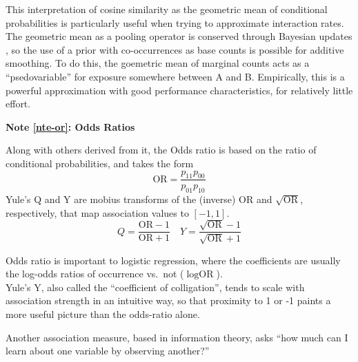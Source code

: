 \documentclass[%
	12pt,
		oneside,
		letterpaper
]{book}
\newcounter{quartocalloutnteno}
\newcommand{\quartocalloutnte}[1]{\refstepcounter{quartocalloutnteno}\label{#1}}
\begin{document}
This interpretation of cosine similarity as the geometric mean of
conditional probabilities is particularly useful when trying to
approximate interaction rates. The geometric mean as a pooling operator
is conserved through Bayesian updates
\autocite{ProbabilityAggregationMethods_Allard2012}, so the use of a
prior with co-occurrences as base counts is possible for additive
smoothing. To do this, the goemetric mean of marginal counts acts as a
``psedovariable'' for exposure somewhere between A and B. Empirically,
this is a powerful approximation with good performance characteristics,
for relatively little effort.

\begin{tcolorbox}[enhanced jigsaw, opacityback=0, colframe=quarto-callout-note-color-frame, arc=.35mm, leftrule=.75mm, breakable, bottomrule=.15mm, left=2mm, colback=white, toprule=.15mm, rightrule=.15mm]

\quartocalloutnte{nte-or} 

\vspace{-3mm}\textbf{Note \ref*{nte-or}: Odds Ratios}\vspace{3mm}

Along with others derived from it, the Odds ratio is based on the ratio
of conditional probabilities, and takes the form
\[\text{OR}=\frac{p_{11}p_{00}}{p_{01}p_{10}}\] Yule's Q and Y
\autocite{MethodsMeasuringAssociation_Yule1912} are mobius transforms of
the (inverse) \(\text{OR}\) and \(\sqrt{\text{OR}}\), respectively, that
map association values to \([-1,1]\).
\[Q = \frac{\text{OR}-1}{\text{OR}+1}\quad Y=\frac{\sqrt{\text{OR}}-1}{\sqrt{\text{OR}}+1}\]

\end{tcolorbox}

Odds ratio is important to logistic regression, where the coefficients
are usually the log-odds ratios of occurrence vs.~not
(\(\log{\text{OR}}\)).\\
Yule's Y, also called the ``coefficient of colligation'', tends to scale
with association strength in an intuitive way, so that proximity to 1 or
-1 paints a more useful picture than the odds-ratio alone.

Another association measure, based in information theory, asks ``how
much can I learn about one variable by observing another?''
\end{document}

